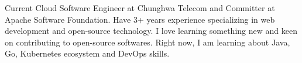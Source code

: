 

\begin{cvparagraph}

Current Cloud Software Engineer at Chunghwa Telecom and Committer at Apache Software Foundation. Have 3+ years experience specializing in web development and open-source technology. I love learning something new and keen on contributing to open-source softwares. Right now, I am learning about Java, Go, Kubernetes ecosystem and DevOps skills.
\end{cvparagraph}
